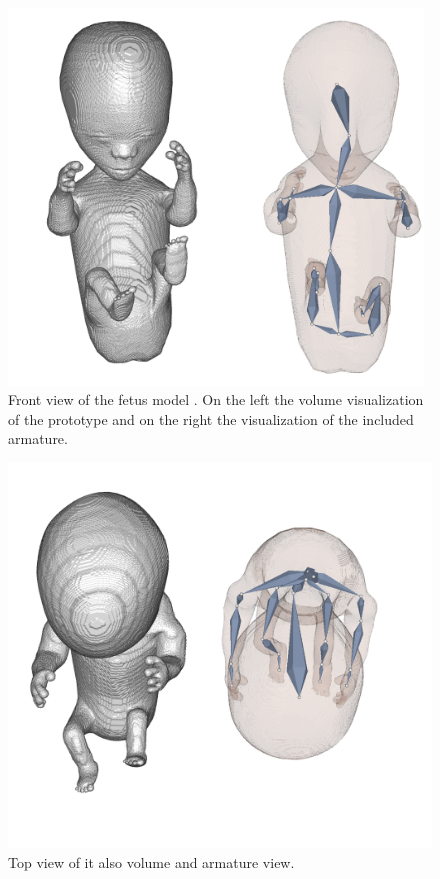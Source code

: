 \begin{figure} [htb!]
    \centering
	\includegraphics[width=11cm]{content/images/results/fetusModelFront.png}
	\caption{Front view of the fetus model \cite{SpecialboyBebyModel}. On the left the volume visualization of the prototype and on the right the visualization of the included armature.}
	\label{fig:}
\end{figure}
\begin{figure} [htb!]
    \centering
	\includegraphics[width=13cm]{content/images/results/fetusModelTop.png}
	\caption{Top view of it also volume and armature view.}
	\label{fig:}
\end{figure}
